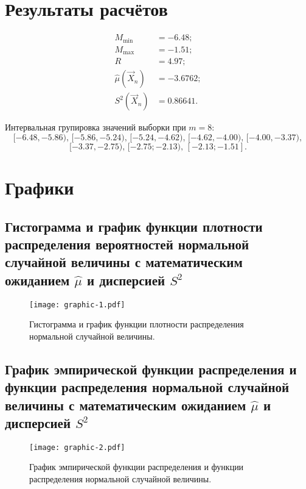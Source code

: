 
\section{Результаты расчётов}

\begin{align*}
    M_{\min} &= -6.48; \\
    M_{\max} &= -1.51; \\
    R &= 4.97; \\
    \hat{\mu}(\vec{X}_n) &= -3.6762; \\
    S^2(\vec{X}_n) &= 0.86641.
\end{align*}

\noindent 
Интервальная групировка значений выборки при $m = 8$:
\[
    [-6.48, -5.86),\, [-5.86, -5.24),\, [-5.24, -4.62),\, [-4.62, -4.00),\, [-4.00, -3.37),
\]
\[
    [-3.37, -2.75),\, [-2.75;-2.13),\, [-2.13;-1.51].
\]



\section{Графики}

\subsection{Гистограмма и график функции плотности распределения вероятностей нормальной случайной величины с математическим ожиданием $\hat{\mu}$ и дисперсией $S^2$}


\begin{figure}[h]
    \centering
    \texttt{[image: graphic-1.pdf]}
    \caption{Гистограмма и график функции плотности распределения нормальной случайной величины.}
\end{figure}



\newpage
\subsection{График эмпирической функции распределения и функции распределения нормальной случайной величины с математическим ожиданием $\hat{\mu}$ и дисперсией $S^2$}

\begin{figure}[h]
    \centering
    \texttt{[image: graphic-2.pdf]}
    \caption{График эмпирической функции распределения и функции распределения нормальной случайной величины.}
\end{figure}